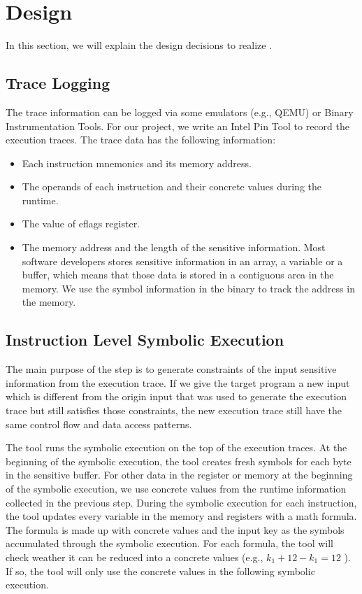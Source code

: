 \section{Design}
In this section, we will explain the design decisions to realize \tool{}. 

\subsection{Trace Logging}
The trace information can be logged via some emulators (e.g., QEMU) or 
Binary Instrumentation Tools. 
For our project, we write an Intel Pin Tool to record the execution traces. 
The trace data has the following information:
\begin{itemize}
    \item Each instruction mnemonics and its memory address.
    \item The operands of each instruction and their concrete values during the 
          runtime.
    \item The value of eflags register. 
    \item The memory address and the length of the sensitive information.
     Most software developers stores sensitive information in an array,
     a variable or a buffer, which means that those data is stored in a contiguous 
     area in the memory. We use the symbol information in the binary to track the 
     address in the memory.

\end{itemize}

\subsection{Instruction Level Symbolic Execution}
\label{InstructionSE}
The main purpose of the step is to generate 
constraints of the input sensitive information from the execution trace. 
If we give the target program a new input which 
is different from the origin input that was used 
to generate the execution trace but still satisfies those constraints,
the new execution trace still have the same control flow and 
data access patterns. 

The tool runs the symbolic execution on the top of the execution traces.
At the beginning of the symbolic execution, the tool creates fresh 
symbols for each byte in the sensitive buffer. For other data in the 
register or memory at the beginning of the symbolic execution,
we use concrete values from the runtime information collected in
the previous step. During the symbolic execution for each instruction, 
the tool updates every variable in the memory and registers with a
math formula. The formula is made up with concrete values and 
the input key as the symbols accumulated through the symbolic execution.
For each formula, the tool will check weather it can be reduced
into a concrete values (e.g., $k_1+12-k_1 = 12$ ). 
If so, the tool will only use the concrete values in the 
following symbolic execution.

